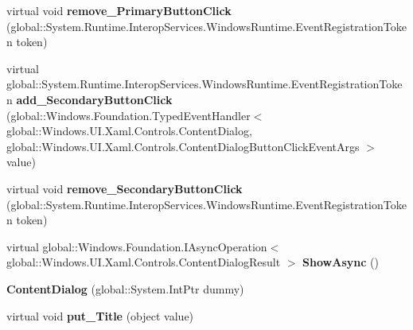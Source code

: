 \begin{DoxyCompactItemize}
\item 
\mbox{\label{class_windows_1_1_u_i_1_1_xaml_1_1_controls_1_1_content_dialog_ad87d51f3f0f3f6e07586f13e8912c5dc}} 
virtual void {\bfseries remove\+\_\+\+Primary\+Button\+Click} (global\+::\+System.\+Runtime.\+Interop\+Services.\+Windows\+Runtime.\+Event\+Registration\+Token token)
\item 
\mbox{\label{class_windows_1_1_u_i_1_1_xaml_1_1_controls_1_1_content_dialog_aa769bea5ba29f6714032e97410b15b2f}} 
virtual global\+::\+System.\+Runtime.\+Interop\+Services.\+Windows\+Runtime.\+Event\+Registration\+Token {\bfseries add\+\_\+\+Secondary\+Button\+Click} (global\+::\+Windows.\+Foundation.\+Typed\+Event\+Handler$<$ global\+::\+Windows.\+U\+I.\+Xaml.\+Controls.\+Content\+Dialog, global\+::\+Windows.\+U\+I.\+Xaml.\+Controls.\+Content\+Dialog\+Button\+Click\+Event\+Args $>$ value)
\item 
\mbox{\label{class_windows_1_1_u_i_1_1_xaml_1_1_controls_1_1_content_dialog_a3dfa1680cb30bf0dc1f3402bc879912e}} 
virtual void {\bfseries remove\+\_\+\+Secondary\+Button\+Click} (global\+::\+System.\+Runtime.\+Interop\+Services.\+Windows\+Runtime.\+Event\+Registration\+Token token)
\item 
\mbox{\label{class_windows_1_1_u_i_1_1_xaml_1_1_controls_1_1_content_dialog_acc6835ff256e59954bab47b9ce049071}} 
virtual global\+::\+Windows.\+Foundation.\+I\+Async\+Operation$<$ global\+::\+Windows.\+U\+I.\+Xaml.\+Controls.\+Content\+Dialog\+Result $>$ {\bfseries Show\+Async} ()
\item 
\mbox{\label{class_windows_1_1_u_i_1_1_xaml_1_1_controls_1_1_content_dialog_ac5cd215d832532c7377d5d28dc7c9e2f}} 
{\bfseries Content\+Dialog} (global\+::\+System.\+Int\+Ptr dummy)
\item 
\mbox{\label{class_windows_1_1_u_i_1_1_xaml_1_1_controls_1_1_content_dialog_a0a34b740496886293e402395da09194f}} 
virtual void {\bfseries put\+\_\+\+Title} (object value)

\end{DoxyCompactItemize}
